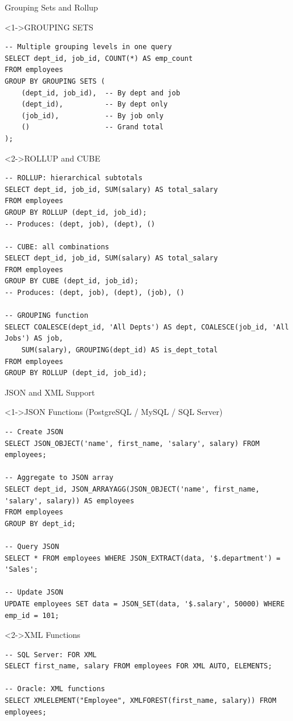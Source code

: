 \documentclass[aspectratio=169,11pt]{beamer}
\begin{document}
\begin{frame}[fragile]{Grouping Sets and Rollup}
\begin{exampleblock}<1->{GROUPING SETS}
\begin{lstlisting}
-- Multiple grouping levels in one query
SELECT dept_id, job_id, COUNT(*) AS emp_count
FROM employees
GROUP BY GROUPING SETS (
    (dept_id, job_id),  -- By dept and job
    (dept_id),          -- By dept only
    (job_id),           -- By job only
    ()                  -- Grand total
);
\end{lstlisting}
\end{exampleblock}

\pause
\begin{exampleblock}<2->{ROLLUP and CUBE}
\begin{lstlisting}
-- ROLLUP: hierarchical subtotals
SELECT dept_id, job_id, SUM(salary) AS total_salary
FROM employees
GROUP BY ROLLUP (dept_id, job_id);
-- Produces: (dept, job), (dept), ()

-- CUBE: all combinations
SELECT dept_id, job_id, SUM(salary) AS total_salary
FROM employees
GROUP BY CUBE (dept_id, job_id);
-- Produces: (dept, job), (dept), (job), ()

-- GROUPING function
SELECT COALESCE(dept_id, 'All Depts') AS dept, COALESCE(job_id, 'All Jobs') AS job,
    SUM(salary), GROUPING(dept_id) AS is_dept_total
FROM employees
GROUP BY ROLLUP (dept_id, job_id);
\end{lstlisting}
\end{exampleblock}
\end{frame}

\begin{frame}[fragile]{JSON and XML Support}
\begin{exampleblock}<1->{JSON Functions (PostgreSQL / MySQL / SQL Server)}
\begin{lstlisting}
-- Create JSON
SELECT JSON_OBJECT('name', first_name, 'salary', salary) FROM employees;

-- Aggregate to JSON array
SELECT dept_id, JSON_ARRAYAGG(JSON_OBJECT('name', first_name, 'salary', salary)) AS employees
FROM employees
GROUP BY dept_id;

-- Query JSON
SELECT * FROM employees WHERE JSON_EXTRACT(data, '$.department') = 'Sales';

-- Update JSON
UPDATE employees SET data = JSON_SET(data, '$.salary', 50000) WHERE emp_id = 101;
\end{lstlisting}
\end{exampleblock}

\pause
\begin{exampleblock}<2->{XML Functions}
\begin{lstlisting}
-- SQL Server: FOR XML
SELECT first_name, salary FROM employees FOR XML AUTO, ELEMENTS;

-- Oracle: XML functions
SELECT XMLELEMENT("Employee", XMLFOREST(first_name, salary)) FROM employees;
\end{lstlisting}
\end{exampleblock}
\end{frame}
\end{document}
